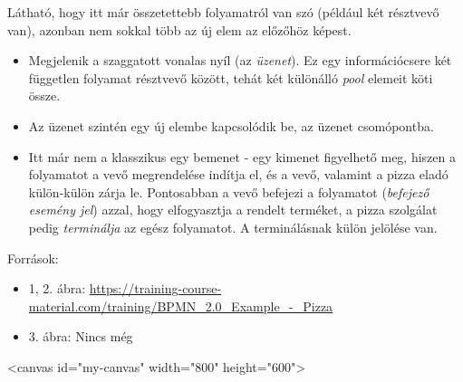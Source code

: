 \documentclass[a4paper]{article}
\begin{document}
Látható, hogy itt már összetettebb folyamatról van szó (például két résztvevő van), azonban nem sokkal több az új elem az előzőhöz képest.

\begin{itemize}
\item Megjelenik a szaggatott vonalas nyíl (az \textit{üzenet}). Ez egy információcsere két független folyamat résztvevő között, tehát két különálló \textit{pool} elemeit köti össze.
\item Az üzenet szintén egy új elembe kapcsolódik be, az üzenet csomópontba.
\item Itt már nem a klasszikus egy bemenet - egy kimenet figyelhető meg, hiszen a folyamatot a vevő megrendelése indítja el, és a vevő, valamint a pizza eladó külön-külön zárja le. Pontosabban a vevő befejezi a folyamatot (\textit{befejező esemény jel}) azzal, hogy elfogyasztja a rendelt terméket, a pizza szolgálat pedig \textit{terminálja} az egész folyamatot. A terminálásnak külön jelölése van.
\end{itemize}

Források:
\begin{itemize}
\item 1, 2. ábra: \url{https://training-course-material.com/training/BPMN_2.0_Example_-_Pizza}
\item 3. ábra: Nincs még
\end{itemize}

\begin{python}
<canvas id="my-canvas" width="800" height="600">
\end{python}
\end{document}
